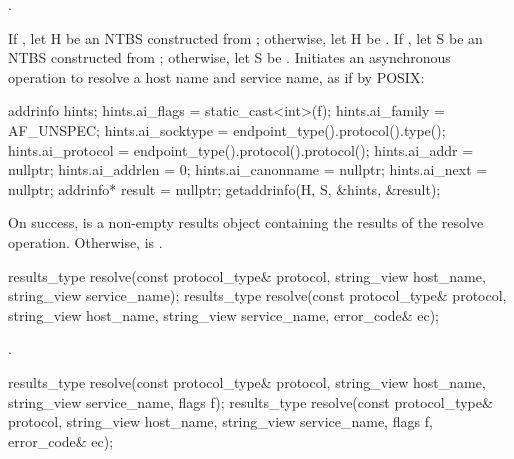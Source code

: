 \begin{itemdescr}
\pnum
\completionsig {}.

\pnum
\effects If , let H be an NTBS constructed from ; otherwise, let H be . If , let S be an NTBS constructed from ; otherwise, let S be . Initiates an asynchronous operation to resolve a host name and service name, as if by POSIX: 
\begin{codeblock}
addrinfo hints;
hints.ai_flags = static_cast<int>(f);
hints.ai_family = AF_UNSPEC;
hints.ai_socktype = endpoint_type().protocol().type();
hints.ai_protocol = endpoint_type().protocol().protocol();
hints.ai_addr = nullptr;
hints.ai_addrlen = 0;
hints.ai_canonname = nullptr;
hints.ai_next = nullptr;
addrinfo* result = nullptr;
getaddrinfo(H, S, &hints, &result);
\end{codeblock}
 On success,  is a non-empty results object containing the results of the resolve operation. Otherwise,  is .
\end{itemdescr}

\begin{itemdecl}
results_type resolve(const protocol_type& protocol,
                     string_view host_name, string_view service_name);
results_type resolve(const protocol_type& protocol,
                     string_view host_name, string_view service_name,
                     error_code& ec);
\end{itemdecl}

\begin{itemdescr}
\pnum
\returns {}.
\end{itemdescr}

\begin{itemdecl}
results_type resolve(const protocol_type& protocol,
                     string_view host_name, string_view service_name,
                     flags f);
results_type resolve(const protocol_type& protocol,
                     string_view host_name, string_view service_name,
                     flags f, error_code& ec);
\end{itemdecl}

